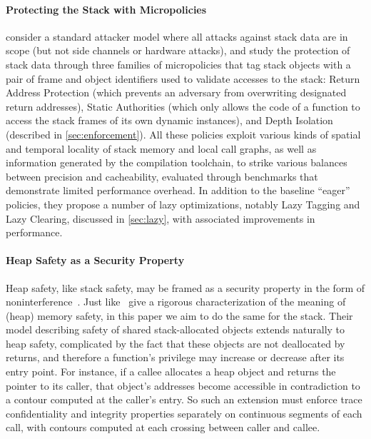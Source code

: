 \documentclass[acmsmall,review,anonymous]{acmart}\settopmatter{printfolios=true,printccs=false,printacmref=false}
\begin{document}
{\paragraph{Protecting the Stack with Micropolicies}
%
\citet{DBLP:conf/sp/RoesslerD18} consider a standard attacker model where all
attacks against stack data are in scope (but not side channels or hardware
attacks), and study the protection of stack data through three families of
micropolicies that tag stack objects with a pair of frame and object identifiers
used to validate accesses to the stack: Return Address Protection (which
prevents an adversary from overwriting designated return addresses), Static
Authorities (which only allows the code of a function to access the stack frames
of its own dynamic instances), and Depth Isolation (described in
\cref{sec:enforcement}). All these policies exploit various kinds of spatial and
temporal locality of stack memory and local call graphs, as well as information
generated by the compilation toolchain, to strike various balances between
precision and cacheability, evaluated through benchmarks that demonstrate
limited performance overhead. In addition to the baseline ``eager'' policies,
they propose a number of lazy optimizations, notably Lazy Tagging and Lazy
Clearing, discussed in \cref{sec:lazy}, with associated improvements in
performance.

\paragraph{Heap Safety as a Security Property}

Heap safety, like stack safety, may be framed as a security property
in the form of noninterference~\citep{DBLP:conf/post/AmorimHP18}. Just
like~\citeauthor{DBLP:conf/post/AmorimHP18} give a rigorous
characterization of the meaning of (heap) memory safety, in this paper
we aim to do the same for the stack.
%
Their model describing safety of shared stack-allocated
objects extends naturally to heap safety, complicated by the fact that
these objects are not deallocated by returns, and therefore a
function's privilege may increase or decrease after its entry
point. For instance, if a callee allocates a heap object and returns
the pointer to its caller, that object's addresses become accessible
in contradiction to a contour computed at the caller's entry. So such
an extension must enforce trace confidentiality and integrity
properties separately on continuous segments of each call, with
contours computed at each crossing between caller and callee.

}
\end{document}
